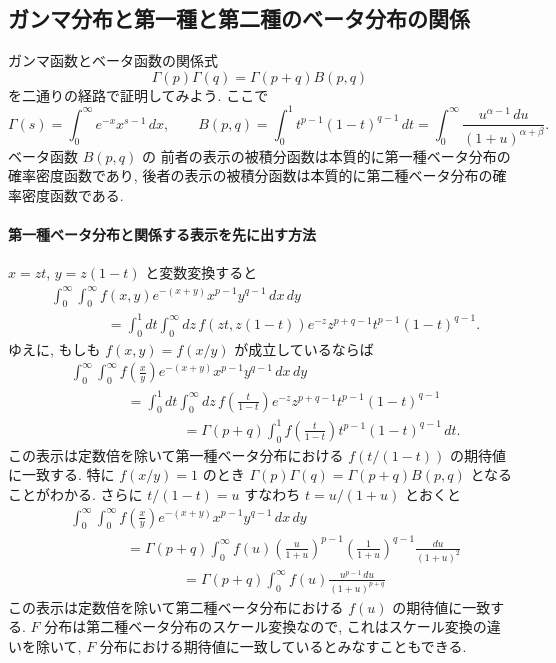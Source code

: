 \documentclass[12pt,twoside]{jarticle}
\theoremstyle{jplain}
\theoremstyle{jplain}
\theoremstyle{jplain}
\numberwithin{theorem}{section}
\numberwithin{equation}{section}
\numberwithin{figure}{section}
\numberwithin{table}{section}
\begin{document}

\subsection{ガンマ分布と第一種と第二種のベータ分布の関係}
\label{sec:Betas}

ガンマ函数とベータ函数の関係式
\[
\Gamma(p)\Gamma(q) = \Gamma(p+q)B(p,q)
\]
を二通りの経路で証明してみよう. ここで
\[
\Gamma(s)=\int_0^\infty e^{-x}x^{s-1}\,dx, \qquad
B(p,q)
=\int_0^1 t^{p-1}(1-t)^{q-1}\,dt
=\int_0^\infty \frac{u^{\alpha-1}\,du}{(1+u)^{\alpha+\beta}}.
\]
ベータ函数 $B(p,q)$ の
前者の表示の被積分函数は本質的に第一種ベータ分布の確率密度函数であり,
後者の表示の被積分函数は本質的に第二種ベータ分布の確率密度函数である.

\paragraph{第一種ベータ分布と関係する表示を先に出す方法}
$x=zt$, $y=z(1-t)$ と変数変換すると
\begin{align*}
&
\int_0^\infty\int_0^\infty f(x,y)e^{-(x+y)}x^{p-1}y^{q-1}\,dx\,dy
\\ & \qquad\qquad
=\int_0^1 dt \int_0^\infty dz\, f(zt,z(1-t))e^{-z}z^{p+q-1}t^{p-1}(1-t)^{q-1}.
\end{align*}
ゆえに, もしも $f(x,y)=f(x/y)$ が成立しているならば
\begin{align*}
&
\int_0^\infty\int_0^\infty f\left(\frac{x}{y}\right)e^{-(x+y)}x^{p-1}y^{q-1}\,dx\,dy
\\ & \qquad\qquad
=\int_0^1 dt \int_0^\infty dz\, f\left(\frac{t}{1-t}\right)e^{-z}z^{p+q-1}t^{p-1}(1-t)^{q-1}
\\ & \qquad\qquad\qquad\qquad
=\Gamma(p+q)\int_0^1 f\left(\frac{t}{1-t}\right)t^{p-1}(1-t)^{q-1}\,dt.
\end{align*}
この表示は定数倍を除いて第一種ベータ分布における $f(t/(1-t))$ の期待値に一致する.
特に $f(x/y)=1$ のとき $\Gamma(p)\Gamma(q)=\Gamma(p+q)B(p,q)$ となることがわかる.
さらに $t/(1-t)=u$ すなわち $t=u/(1+u)$ とおくと
\begin{align*}
&
\int_0^\infty\int_0^\infty f\left(\frac{x}{y}\right)e^{-(x+y)}x^{p-1}y^{q-1}\,dx\,dy
\\ & \qquad\qquad
=\Gamma(p+q)\int_0^\infty f(u)
\left(\frac{u}{1+u}\right)^{p-1}\left(\frac{1}{1+u}\right)^{q-1}\frac{du}{(1+u)^2}
\\ & \qquad\qquad\qquad\qquad
=\Gamma(p+q)\int_0^\infty f(u)\frac{u^{p-1}\,du}{(1+u)^{p+q}}
\end{align*}
この表示は定数倍を除いて第二種ベータ分布における $f(u)$ の期待値に一致する.
$F$ 分布は第二種ベータ分布のスケール変換なので,
これはスケール変換の違いを除いて,
$F$ 分布における期待値に一致しているとみなすこともできる.
\end{document}
